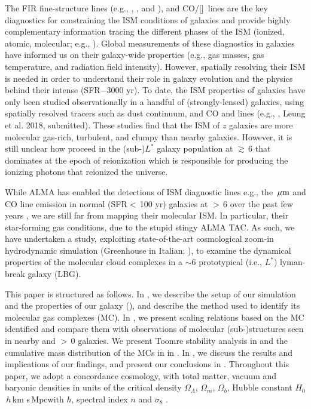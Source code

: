 \documentclass[apj]{emulateapj} %
\begin{document}
The FIR fine-structure lines (e.g., \cii, \nii, and \oiii), and CO/[\ci]~lines are the key diagnostics for 
constraining the ISM conditions of galaxies and
provide highly complementary information tracing the different phases of the ISM (ionized, 
atomic, molecular; e.g., \citealt{Scoville74a, Rubin85a, Malhotra01a}).
Global measurements of these diagnostics in \highz galaxies 
have informed us on their galaxy-wide properties (e.g., 
gas masses, gas temperature, and radiation field intensity).
However, spatially resolving their ISM is needed in order to understand their role in galaxy evolution and 
the physics behind their intense \SF (SFR$-$3000\,\Msun\,yr\pmOne).
To date, the ISM properties of \highz galaxies 
have only been studied observationally in a handful of (strongly-lensed) 
galaxies, using spatially resolved tracers such as 
dust continuum, and CO and \cii lines (e.g., \citealt{Swinbank11a, Hodge15a, Ferkinhoff15a, Hodge16a},
Leung et al. 2018, submitted).
These studies find that the ISM of $z$ galaxies are more 
molecular gas-rich, turbulent, and clumpy than nearby galaxies.
However, it is still unclear how \SF proceed in the (sub-)$L^*$ galaxy population at \z$\gtrsim$\,6 
that dominates  \SF at the epoch of reionization which is responsible for producing the 
ionizing photons that reionized the universe.

While ALMA has enabled the detections of 
ISM diagnostic lines e.g., the \,$\mbox{$\mu$m}$ and CO line emission in 
normal (SFR$<$\,100\,\Msun\,yr\pmOne) galaxies at \z$>$\,6 over the past few years \citep[e.g.,][]{Smit18a},
we are still far from mapping their molecular ISM.
In particular, their star-forming gas conditions, due to the stupid stingy ALMA TAC.
As such, we have undertaken a study, exploiting 
state-of-the-art cosmological zoom-in hydrodynamic simulation 
 (Greenhouse in Italian; \citealt{Pallottini17a, Pallottini17b}), to examine 
the dynamical properties of the molecular cloud complexes in a \z$\sim$6 prototypical (i.e., $L^*$) lyman-break
galaxy (LBG).

This paper is structured as follows.
In , we describe the setup of our simulation and the properties of our galaxy (\flower),
and describe the method used to identify its molecular gas complexes (MC). 
In , we present scaling relations based on 
the MC identified and compare them with observations of molecular 
(sub-)structures seen in nearby and \z$>$\,0 galaxies.
We present Toomre stability analysis in  and 
the cumulative mass distribution of the MCs in \flower in .
In , we discuss the results and implications of our findings,
and present our conclusions in .
Throughout this paper, we adopt a concordance cosmology, with total matter, vacuum and baryonic densities 
in units of the critical density $\Omega_{\Lambda}$, $\Omega_m$, $\Omega_b$, 
Hubble constant $H_0$\,$h$\,km s\pmOne\,Mpc\pmOne with $h$, 
spectral index $n$ and $\sigma_8$ \citep{Planck14a}.
\end{document}
